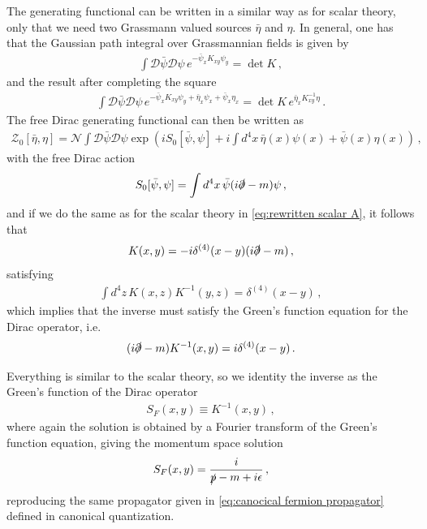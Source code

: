 The generating functional can be written in a similar way as for scalar theory, only that we need two Grassmann valued sources $\bar{\eta}$ and $\eta$. In general, one has that the Gaussian path integral over Grassmannian fields is given by
\begin{align}
    \int\mathcal{D}\bar{\psi}\mathcal{D}\psi\,e^{-\bar{\psi}_{x}K_{xy}\psi_{y}}=\det K\,,
\end{align}
and the result after completing the square
\begin{align}
    \int\mathcal{D}\bar{\psi}\mathcal{D}\psi\,e^{-\bar{\psi}_{x}K_{xy}\psi_{y}+\bar{\eta}_{x}\psi_{x}+\bar{\psi}_{x}\eta_{x}}=\det K\,e^{\bar{\eta}_{x}K_{xy}^{-1}\eta}\,.
\end{align}
The free Dirac generating functional can then be written as
\begin{align}\label{eq:free Dirac generating functional}
    \mathcal{Z}_{0}[\bar{\eta},\eta]=\mathcal{N}\int\mathcal{D}\bar{\psi}\mathcal{D}\psi\exp(iS_{0}[\bar{\psi},\psi]+i\int d^{4}x\,\bar{\eta}(x)\psi(x)+\bar{\psi}(x)\eta(x))\,,
\end{align}
with the free Dirac action
\begin{align}
    S_{0}[\bar{\psi},\psi]=\int d^{4}x\,\bar{\psi}(i\slashed{\partial}-m)\psi\,,
\end{align}
and if we do the same as for the scalar theory in \cref{eq:rewritten scalar A}, it follows that
\begin{align}
    K(x,y)=-i\delta^{(4)}(x-y)(i\slashed{\partial}-m)\,,
\end{align}
satisfying
\begin{align}
    \int d^{4}z\,K(x,z)K^{-1}(y,z)=\delta^{(4)}(x-y)\,,
\end{align}
which implies that the inverse must satisfy the Green's function equation for the Dirac operator, i.e.
\begin{align}
    (i\slashed{\partial}-m)K^{-1}(x,y)=i\delta^{(4)}(x-y)\,.
\end{align}

Everything is similar to the scalar theory, so we identity the inverse as the Green's function of the Dirac operator
\begin{align}
    S_{F}(x,y)\equiv K^{-1}(x,y)\,,
\end{align}
where again the solution is obtained by a Fourier transform of the Green's function equation, giving the momentum space solution
\begin{align}
    S_{F}(x,y)=\frac{i}{\slashed{p}-m+i\epsilon}\,,
\end{align}
reproducing the same propagator given in \cref{eq:canocical fermion propagator} defined in canonical quantization.

